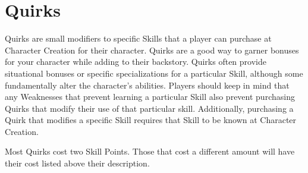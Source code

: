 \documentclass[oneside]{book}
\begin{document}
\chapter{Quirks}
Quirks are small modifiers to specific Skills that a player can purchase at Character Creation for their character. Quirks are a good way to garner bonuses for your character while adding to their backstory. Quirks often provide situational bonuses or specific specializations for a particular Skill, although some fundamentally alter the character's abilities. Players should keep in mind that any Weaknesses that prevent learning a particular Skill also prevent purchasing Quirks that modify their use of that particular skill. Additionally, purchasing a Quirk that modifies a specific Skill requires that Skill to be known at Character Creation.  

Most Quirks cost two Skill Points. Those that cost a different amount will have their cost listed above their description. 
\end{document}
